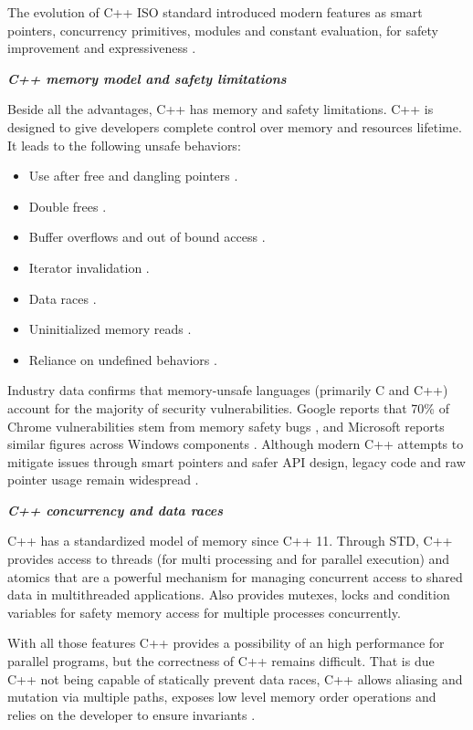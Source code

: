 The evolution of C++ ISO standard introduced modern features as smart pointers, concurrency primitives, 
modules and constant evaluation, for safety improvement and expressiveness \parencite{ISO_Cpp2020}.


\textbf{\textit{C++ memory model and safety limitations}}

Beside all the advantages, C++ has memory and safety limitations. 
C++ is designed to give developers complete control over memory and resources lifetime. 
It leads to the following unsafe behaviors:
\begin{itemize}
    \item Use after free and dangling pointers \parencite{msrc2020memory}.
    \item Double frees \parencite{msrc2020memory}.
    \item Buffer overflows and out of bound access \parencite{msrc2020memory}.
    \item Iterator invalidation \parencite{stroustrup2013cpp}.
    \item Data races \parencite{stroustrup2013cpp}.
    \item Uninitialized memory reads \parencite{msrc2020memory}.
    \item Reliance on undefined behaviors \parencite{stroustrup2013cpp}.
\end{itemize}

Industry data confirms that memory-unsafe languages (primarily C and C++) account for the majority of 
security vulnerabilities. 
Google reports that 70\% of Chrome vulnerabilities stem from memory safety bugs \parencite{google2022memory}, 
and Microsoft reports similar figures across Windows components \parencite{msrc2020memory}. 
Although modern C++ attempts to mitigate issues through smart pointers and safer API design, 
legacy code and raw pointer usage remain widespread \parencite{CppCon2020}.

\textbf{\textit{C++ concurrency and data races}}

C++ has a standardized model of memory since C++ 11. 
Through \gls{STD}, C++ provides access to threads (for multi processing and for parallel execution) 
and atomics that are a powerful mechanism for managing concurrent access to shared data in multithreaded applications.
Also provides mutexes, locks and condition variables for safety memory access for multiple processes concurrently.

With all those features C++ provides a possibility of an high performance for parallel programs, 
but the correctness of C++ remains difficult.
That is due C++ not being capable of statically prevent data races, 
C++ allows aliasing and mutation via multiple paths, exposes low level memory order operations 
and relies on the developer to ensure invariants \parencite{Stroustrup2020}.

